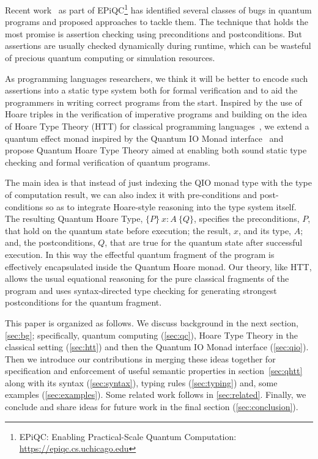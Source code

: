\documentclass[acmsmall,nonacm,timestamp,review=false,anonymous=false]{acmart}
\begin{document}
Recent work~\cite{huang_qdb:_2018,huang_statistical_2019} as part of EPiQC\footnote{EPiQC: Enabling Practical-Scale Quantum Computation:  \url{https://epiqc.cs.uchicago.edu}} has identified several classes of bugs in quantum programs and proposed approaches to tackle them. The technique that holds the most promise is assertion checking using preconditions and postconditions. But assertions are usually checked dynamically during runtime, which can be wasteful of precious quantum computing or simulation resources.

As programming languages researchers, we think it will be better to encode such assertions into a static type system both for formal verification and to aid the programmers in writing correct programs from the start. Inspired by the use of Hoare triples in the verification of imperative programs and building on the idea of Hoare Type Theory (HTT) for classical programming languages~\cite{nanevski_hoare_2008}, we extend a quantum effect monad inspired by the Quantum IO Monad interface~\cite{qio} and propose Quantum Hoare Type Theory aimed at enabling both sound static type checking and formal verification of quantum programs.

The main idea is that instead of just indexing the QIO monad type with the type of computation result, we can also index it with pre-conditions and post-conditions so as to integrate Hoare-style reasoning into the type system itself. The resulting Quantum Hoare Type, $\{P\}\ x{ : }A\ \{Q\}$, specifies the preconditions, $P$, that hold on the quantum state before execution; the result, $x$, and its type, $A$; and, the postconditions, $Q$, that are true for the quantum state after successful execution. In this way the effectful quantum fragment of the program is effectively encapsulated inside the Quantum Hoare monad. Our theory, like HTT, allows the usual equational reasoning for the pure classical fragments of the program and uses syntax-directed type checking for generating strongest postconditions for the quantum fragment.

This paper is organized as follows. We discuss background in the next section, \cref{sec:bg}; specifically, quantum computing (\cref{sec:qc}),  Hoare Type Theory in the classical setting (\cref{sec:htt}) and then the Quantum IO Monad interface (\cref{sec:qio}). Then we introduce our contributions in merging these ideas together for specification and enforcement of useful semantic properties in section~\cref{sec:qhtt} along with its syntax (\cref{sec:syntax}), typing rules (\cref{sec:typing}) and, some examples (\cref{sec:examples}). Some related work follows in \cref{sec:related}. Finally, we conclude and share ideas for future work in the final section (\cref{sec:conclusion}).
\end{document}

